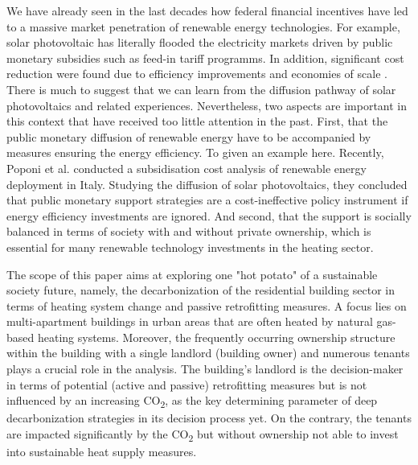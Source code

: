 We have already seen in the last decades how federal financial incentives have led to a massive market penetration of renewable energy technologies. For example, solar photovoltaic has literally flooded the electricity markets driven by public monetary subsidies such as feed-in tariff programms. In addition, significant cost reduction were found due to efficiency improvements and economies of scale \cite{haas2011historical}. There is much to suggest that we can learn from the diffusion pathway of solar photovoltaics and related experiences. Nevertheless, two aspects are important in this context that have received too little attention in the past. First, that the public monetary diffusion of renewable energy have to be accompanied by measures ensuring the energy efficiency. To given an example here. Recently, Poponi et al. \cite{poponi2021subsidisation} conducted a subsidisation cost analysis of renewable energy deployment in Italy. Studying the diffusion of solar photovoltaics, they concluded that public monetary support strategies are a cost-ineffective policy instrument if energy efficiency investments are ignored. And second, that the support is socially balanced in terms of society with and without private ownership, which is essential for many renewable technology investments in the heating sector.\vspace{0.5cm}

The scope of this paper aims at exploring one "hot potato" of a sustainable society future, namely, the decarbonization of the residential building sector in terms of heating system change and passive retrofitting measures. A focus lies on multi-apartment buildings in urban areas that are often heated by natural gas-based heating systems. Moreover, the frequently occurring ownership structure within the building with a single landlord (building owner) and numerous tenants plays a crucial role in the analysis. The building's landlord is the decision-maker in terms of potential (active and passive) retrofitting measures but is not influenced by an increasing CO\textsubscript{2}, as the key determining parameter of deep decarbonization strategies in its decision process yet. On the contrary, the tenants are impacted significantly by the CO\textsubscript{2} but without ownership not able to invest into sustainable heat supply measures.\vspace{0.5cm}

